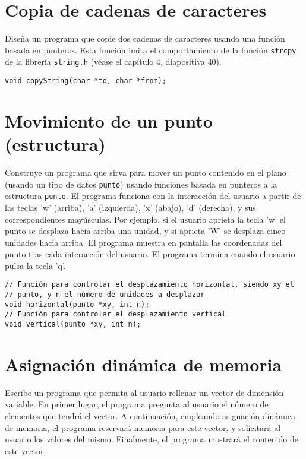 \documentclass[a4paper]{article}
\begin{document}
\section{Copia de cadenas de caracteres}
\label{sec:orgfd59471}

Diseña un programa que copie dos cadenas de caracteres usando una función basada en punteros. Esta función imita el comportamiento de la función \texttt{strcpy} de la librería \texttt{string.h} (véase el capítulo 4, diapositiva 40).

\lstset{language=C,label= ,caption= ,captionpos=b,numbers=none}
\begin{lstlisting}
void copyString(char *to, char *from);
\end{lstlisting}

\section{Movimiento de un punto (estructura)}
\label{sec:orgec2b9d6}

Construye un programa que sirva para mover un punto contenido en el plano (usando un tipo de datos \texttt{punto}) usando funciones basada en punteros a la estructura \texttt{punto}. El programa funciona con la interacción del usuario a partir de las teclas 'w' (arriba), 'a' (izquierda), 'x' (abajo), 'd' (derecha), y sus correspondientes mayúsculas. Por ejemplo, si el usuario aprieta la tecla 'w' el punto se desplaza hacia arriba una unidad, y si aprieta 'W' se desplaza cinco unidades hacia arriba. El programa muestra en pantalla las coordenadas del punto tras cada interacción del usuario.
El programa termina cuando el usuario pulsa la tecla 'q'.

\lstset{language=C,label= ,caption= ,captionpos=b,numbers=none}
\begin{lstlisting}
// Función para controlar el desplazamiento horizontal, siendo xy el
// punto, y n el número de unidades a desplazar
void horizontal(punto *xy, int n);
// Función para controlar el desplazamiento vertical
void vertical(punto *xy, int n);
\end{lstlisting}

\section{Asignación dinámica de memoria}
\label{sec:org65f6432}
Escribe un programa que permita al usuario rellenar un vector de dimensión variable. En primer lugar, el programa pregunta al usuario el número de elementos que tendrá el vector. A continuación, empleando asignación dinámica de memoria, el programa reservará memoria para este vector, y solicitará al usuario los valores del mismo. Finalmente, el programa mostrará el contenido de este vector.
\end{document}

